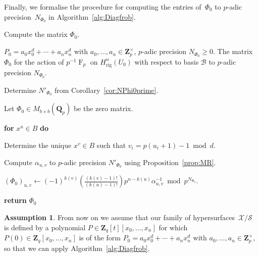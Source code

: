 \documentclass[a4paper,11pt]{article}
\numberwithin{equation}{section}
\newcommand{\ZZ}{\mathbf{Z}} %
\newcommand{\QQ}{\mathbf{Q}} %
\DeclareMathOperator{\Frob}{F}           %
\providecommand{\Hrig}{H_{\text{rig}}}  %
\providecommand{\cB}{\mathcal{B}} %
\theoremstyle{definition}
\newtheorem{assump}[thm]{Assumption}
\begin{document}
Finally, we formalise the procedure for computing the entries of~$\Phi_0$ to $p$-adic precision~$N_{\Phi_0}$ in 
Algorithm~\ref{alg:Diagfrob}.

\begin{algorithm}
\caption{Compute the matrix $\Phi_0$.}
\label{alg:Diagfrob}
\begin{algorithmic}
\vspace{1mm}
\Require $P_0=a_0 x_0^d + \dotsb + a_n x_n^d$ 
         with $a_0,\dotsc,a_n \in \ZZ_p^{\times}$, 
         $p$-adic precision $N_{\Phi_0} \geq 0$.
\Ensure  The matrix $\Phi_0$ for the action of $p^{-1} \Frob_p$ 
         on $\Hrig^n(U_0)$ with respect to basis $\cB$ to $p$-adic 
         precision $N_{\Phi_0}$.
\State \begin{compactenum}[{\hspace{1em}} 1.] \vspace{-1.24em}
\item Determine $N'_{\Phi_0}$ from Corollary~\ref{cor:NPhi0prime}. 
\item Let $\Phi_0 \in M_{b \times b}(\QQ_p)$ be the zero matrix.
\item[] \textbf{for} $x^u \in B$ \textbf{do} 
\item[] \begin{compactenum}[{\hspace{1em}} 1.]
        \item Determine the unique $x^v \in B$ such that $v_i = p (u_i + 1) - 1 \bmod{d}$.
        \item Compute $\alpha_{u,v}$ to $p$-adic 
              precision $N'_{\Phi_0}$ using Proposition~\ref{prop:MR}.
        \item $(\Phi_0)_{u,v} \gets (-1)^{k(v)} \left( \frac{ (k(v)-1)!}{(k(u)-1)!} \right) p^{n-k(u)} \alpha_{u,v}^{-1} \bmod{p^{N_{\Phi_0}}}$.
      \end{compactenum}   
 \item \textbf{return} $\Phi_0$      
\end{compactenum}
\EndProcedure
\end{algorithmic}
\end{algorithm}

\begin{assump} \label{assump:diag}
From now on we assume that our family of 
hypersurfaces~$\mathcal{X}/\mathcal{S}$ is defined by a 
polynomial $P \in \ZZ_q[t][x_0,\dotsc,x_n]$ for which 
$P(0) \in \ZZ_q[x_0,\dotsc,x_n]$ is of the form 
$P_0=a_0 x_0^d + \dotsb + a_n x_n^d$ with $a_0,\dotsc,a_n \in \ZZ_p^{\times}$, 
so that we can apply Algorithm~\ref{alg:Diagfrob}. 
\end{assump}
\end{document}

